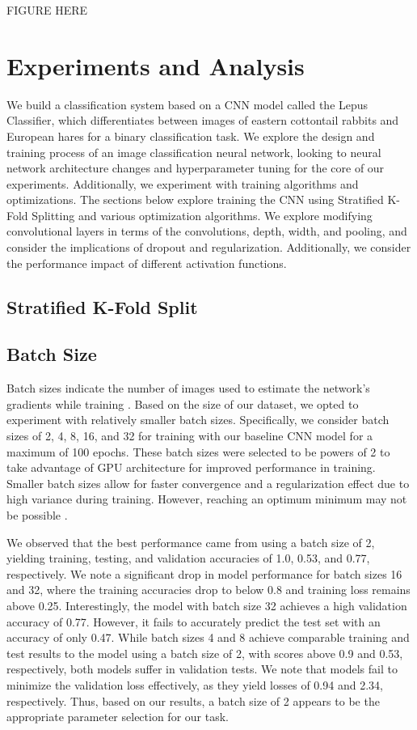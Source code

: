 \documentclass{article}
\begin{document}
FIGURE HERE

\section{Experiments and Analysis}
We build a classification system based on a CNN model called the Lepus Classifier, which differentiates between images of eastern cottontail rabbits and European hares for a binary classification task. We explore the design and training process of an image classification neural network, looking to neural network architecture changes and hyperparameter tuning for the core of our experiments. Additionally, we experiment with training algorithms and optimizations. The sections below explore training the CNN using Stratified K-Fold Splitting and various optimization algorithms. We explore modifying convolutional layers in terms of the convolutions, depth, width, and pooling, and consider the implications of dropout and regularization. Additionally, we consider the performance impact of different activation functions.  

\subsection{Stratified K-Fold Split}
\subsection{Batch Size}
Batch sizes indicate the number of images used to estimate the network’s gradients while training \cite{KANDEL2020312}. Based on the size of our dataset, we opted to experiment with relatively smaller batch sizes. Specifically, we consider batch sizes of 2, 4, 8, 16, and 32 for training with our baseline CNN model for a maximum of 100 epochs. These batch sizes were selected to be powers of 2 to take advantage of GPU architecture for improved performance in training. Smaller batch sizes allow for faster convergence and a regularization effect due to high variance during training. However, reaching an optimum minimum may not be possible \cite{KANDEL2020312}. 

We observed that the best performance came from using a batch size of 2, yielding training, testing, and validation accuracies of 1.0, 0.53, and 0.77, respectively. We note a significant drop in model performance for batch sizes 16 and 32, where the training accuracies drop to below 0.8 and training loss remains above 0.25. Interestingly, the model with batch size 32 achieves a high validation accuracy of 0.77. However, it fails to accurately predict the test set with an accuracy of only 0.47. While batch sizes 4 and 8 achieve comparable training and test results to the model using a batch size of 2, with scores above 0.9 and 0.53, respectively, both models suffer in validation tests. We note that models fail to minimize the validation loss effectively, as they yield losses of 0.94 and 2.34, respectively. Thus, based on our results, a batch size of 2 appears to be the appropriate parameter selection for our task.
\end{document}
